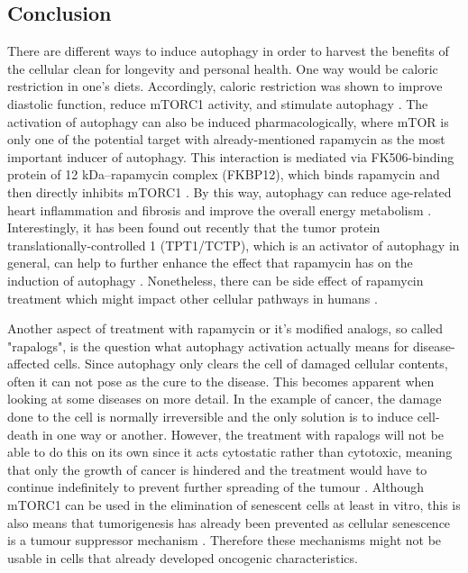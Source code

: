 \documentclass[12pt]{article} %
\begin{document}
\begin{linenumbers*}

\section{Conclusion} %

There are different ways to induce autophagy in order to harvest the benefits of the cellular clean for longevity and personal health. One way would be caloric restriction in one's diets. Accordingly, caloric restriction was shown to improve diastolic function, reduce mTORC1 activity, and stimulate autophagy \citep{Sciarretta2018}.
The activation of autophagy can also be induced pharmacologically, where mTOR is only one of the potential target with already-mentioned rapamycin as the most important inducer of autophagy. This interaction is mediated via FK506-binding protein of 12 kDa–rapamycin complex (FKBP12), which binds rapamycin and then directly inhibits mTORC1 \citep{Sciarretta2018, Dikic2018}. By this way, autophagy can reduce age-related heart inflammation and fibrosis and improve the overall energy metabolism \citep{Sciarretta2018}. Interestingly, it has been found out recently that the tumor protein translationally-controlled 1 (TPT1/TCTP), which is an activator of autophagy in general, can help to further enhance the effect that rapamycin has on the induction of autophagy \citep{Bae2017}.
Nonetheless, there can be side effect of rapamycin treatment which might impact other cellular pathways in humans \citep{Dikic2018}.

Another aspect of treatment with rapamycin or it's modified analogs, so called "rapalogs", is the question what autophagy activation actually means for disease-affected cells. Since autophagy only clears the cell of damaged cellular contents, often it can not pose as the cure to the disease. This becomes apparent when looking at some diseases on more detail. In the example of cancer, the damage done to the cell is normally irreversible and the only solution is to induce cell-death in one way or another. However, the treatment with rapalogs will not be able to do this on its own since it acts cytostatic rather than cytotoxic, meaning that only the growth of cancer is hindered and the treatment would have to continue indefinitely to prevent further spreading of the tumour \citep{Lane2017b}. Although mTORC1 can be used in the elimination of senescent cells at least in vitro, this is also means that tumorigenesis has already been prevented as cellular senescence is a tumour suppressor mechanism \citep{Kucheryavenko2019}. 
Therefore these mechanisms might not be usable in cells that already developed oncogenic characteristics. 

\end{linenumbers*}
\end{document}
